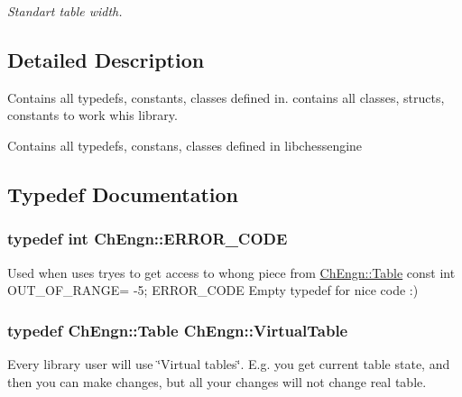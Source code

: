 \begin{DoxyCompactItemize}
\begin{DoxyCompactList}\small\item\em Standart table width. \item\end{DoxyCompactList}\end{DoxyCompactItemize}


\subsection{Detailed Description}
Contains all typedefs, constants, classes defined in. contains all classes, structs, constants to work whis library.

Contains all typedefs, constans, classes defined in libchessengine 

\subsection{Typedef Documentation}
\hypertarget{namespaceChEngn_a347ab4e4a29f725ed0253d8311c82233}{
\subsubsection[{ERROR\_\-CODE}]{\setlength{\rightskip}{0pt plus 5cm}typedef int {\bf ChEngn::ERROR\_\-CODE}}}
\label{namespaceChEngn_a347ab4e4a29f725ed0253d8311c82233}
Used when uses tryes to get access to whong piece from \hyperlink{classChEngn_1_1Table}{ChEngn::Table} const int OUT\_\-OF\_\-RANGE= -\/5; ERROR\_\-CODE Empty typedef for nice code :) \hypertarget{namespaceChEngn_a5ba229504d25ed1b2086f1df62f6db41}{
\subsubsection[{VirtualTable}]{\setlength{\rightskip}{0pt plus 5cm}typedef {\bf ChEngn::Table} {\bf ChEngn::VirtualTable}}}
\label{namespaceChEngn_a5ba229504d25ed1b2086f1df62f6db41}
Every library user will use \char`\"{}Virtual tables\char`\"{}. E.g. you get current table state, and then you can make changes, but all your changes will not change real table. 

